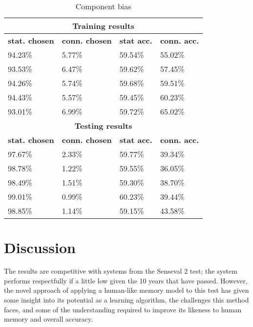 \begin{table}[htp]
	\centering 
	\begin{tabular}{|l|l|l|l|}
		\hline
		\multicolumn{4}{|c|}{\bf Training results } \\ \hline
		{\bf stat. chosen } & {\bf conn. chosen } & {\bf stat acc.} & {\bf conn. acc.}\\ \hline
		94.23\%             & 5.77\%              &  59.54\%        & 55.02\% \\ \hline
		93.53\%             & 6.47\%              &  59.62\%        & 57.45\% \\ \hline
		94.26\%             & 5.74\%              &  59.68\%        & 59.51\% \\ \hline
		94.43\%             & 5.57\%              &  59.45\%        & 60.23\% \\ \hline
		93.01\%             & 6.99\%              &  59.72\%        & 65.02\% \\ \hline
	    \multicolumn{4}{|c|}{\bf Testing results } \\ \hline
		{\bf stat. chosen } & {\bf conn. chosen } & {\bf stat acc.} & {\bf conn. acc.}\\ \hline
		97.67\%             & 2.33\%              &  59.77\%        & 39.34\% \\ \hline
		98.78\%             & 1.22\%              &  59.55\%        & 36.05\% \\ \hline
		98.49\%             & 1.51\%              &  59.30\%        & 38.70\% \\ \hline
		99.01\%             & 0.99\%              &  60.23\%        & 39.44\% \\ \hline
		98.85\%             & 1.14\%              &  59.15\%        & 43.58\% \\ \hline
	\end{tabular}
	\caption{Component bias \label{table:BIASNESS}}
\end{table}

\section{Discussion}

The results are competitive with systems from the Senseval 2 test; the system
performs respectfully if a little low given the 10 years that have passed.
However, the novel approach of applying a human-like memory model to this test
has given some insight into its potential as a learning algorithm, the
challenges this method faces, and some of the understanding required to improve
its likeness to human memory and overall accuracy.

